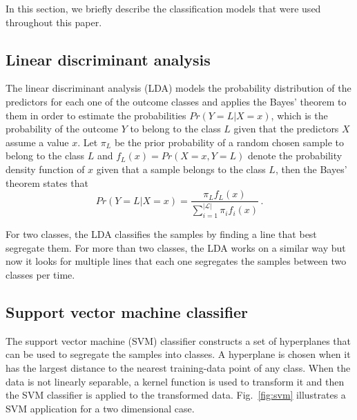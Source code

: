 \documentclass[conference]{IEEEtran}
\begin{document}
In this section, we briefly describe the classification models that were used throughout this paper.

\subsection{Linear discriminant analysis}
The linear discriminant analysis (LDA) models the probability distribution of the predictors for each one of the outcome classes and applies the Bayes' theorem to them in order to estimate the probabilities $Pr(Y=L | X=x)$, which is the probability of the outcome $Y$ to belong to the class $L$ given that the predictors $X$ assume a value $x$. Let $\pi_L$ be the prior probability of a random chosen sample to belong to the class $L$ and $f_L(x) = Pr(X=x, Y=L)$ denote the probability density function of $x$ given that a sample belongs to the class $L$, then the Bayes' theorem states that
%
\begin{equation}
  Pr(Y=L | X=x) = \frac{\pi_L f_L(x)}{\sum_{i = 1}^{|\mathcal{L}|} \pi_i f_i(x)}\,.
\end{equation}

For two classes, the LDA classifies the samples by finding a line that best segregate them. For more than two classes, the LDA works on a similar way but now it looks for multiple lines that each one segregates the samples between two classes per time.

\subsection{Support vector machine classifier}

The support vector machine (SVM) classifier constructs a set of hyperplanes that can be used to segregate the samples into classes. A hyperplane is chosen when it has the largest distance to the nearest training-data point of any class. When the data is not linearly separable, a kernel function is used to transform it and then the SVM classifier is applied to the transformed data. Fig.~\ref{fig:svm} illustrates a SVM application for a two dimensional case.
\end{document}
